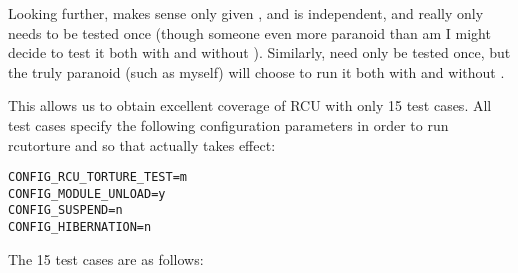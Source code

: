 Looking further,  makes sense only
given , and 
is independent, and really only needs to be tested once (though someone
even more paranoid than am I might decide to test it both with
and without ).
Similarly,  need only be tested once,
but the truly paranoid (such as myself) will choose to run it both with
and without .

This allows us to obtain excellent coverage of RCU with only 15
test cases.
All test cases specify the following configuration parameters in order
to run rcutorture and so that  actually
takes effect:

\vspace{5pt}
\begin{minipage}[t]{\columnwidth}
\scriptsize
\begin{verbatim}
CONFIG_RCU_TORTURE_TEST=m
CONFIG_MODULE_UNLOAD=y
CONFIG_SUSPEND=n
CONFIG_HIBERNATION=n
\end{verbatim}
\end{minipage}
\vspace{5pt}

The 15 test cases are as follows:

